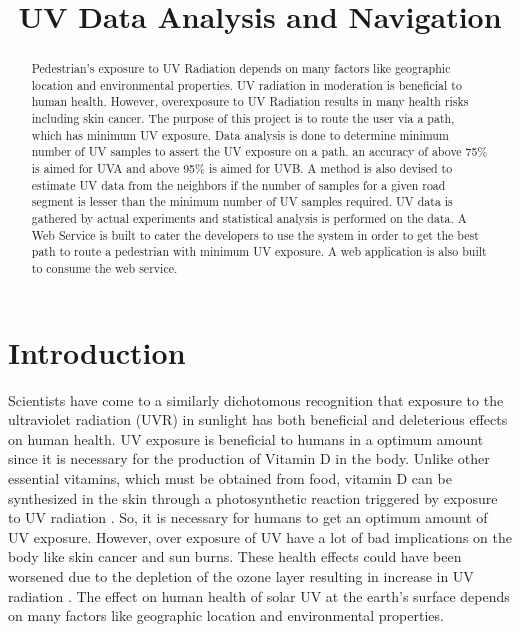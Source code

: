\documentclass[conference]{IEEETran}
\begin{document}
\title{\textbf{ UV Data Analysis and Navigation}}
\author{}

\date{}
\maketitle


\begin{abstract}
Pedestrian’s exposure to UV Radiation depends on many factors like geographic location and environmental properties. UV radiation in moderation is beneficial to human health. However, overexposure to UV Radiation results in many health risks including skin cancer. The purpose of this project is to route the user via a path, which has minimum UV exposure. Data analysis is done to determine minimum number of UV samples to assert the UV exposure on a path. an accuracy of above 75\% is aimed for UVA and above 95\% is aimed for UVB. A method is also devised to estimate UV data from the neighbors if the number of samples for a given road segment is lesser than the minimum number of UV samples required. UV data is gathered by actual experiments and statistical analysis is performed on the data. A Web Service is built to cater the developers to use the system in order to get the best path to route a pedestrian with minimum UV exposure. A web application is also built to consume the web service.
\end{abstract}

\section{Introduction}
Scientists have come to a similarly dichotomous recognition that exposure to the ultraviolet radiation (UVR) in sunlight has both beneficial and deleterious effects on human health. UV exposure is beneficial to humans in a optimum amount since it is necessary for the production of Vitamin D in the body. Unlike other essential vitamins, which must be obtained from food, vitamin D can be synthesized in the skin through a photosynthetic reaction triggered by exposure to UV radiation \cite{dep1}. So, it is necessary for humans to get an optimum amount of UV exposure. However, over exposure of UV have a lot of bad implications on the body like skin cancer and sun burns. These health effects could have been worsened due to the depletion of the ozone layer resulting in increase in UV radiation \cite{dep2}. The effect on human health of solar UV at the earth’s surface depends on many factors like geographic location and environmental properties.  
\end{document}
